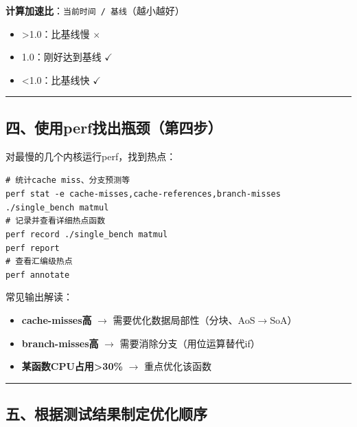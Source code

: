 \documentclass[11pt, a4paper]{article}
\begin{document}
\begin{aibox}
\textbf{计算加速比}：\texttt{当前时间 / 基线}（越小越好）
\begin{itemize}
    \item \textgreater 1.0：比基线慢 $\times$
    \item 1.0：刚好达到基线 $\checkmark$
    \item \textless 1.0：比基线快 $\checkmark$
\end{itemize}

\begin{center}\rule{\textwidth}{0.4pt}\end{center}

\subsection*{四、使用perf找出瓶颈（第四步）}

对最慢的几个内核运行perf，找到热点：

\begin{tcolorbox}[colback=white,colframe=gray!50!white,boxrule=0.5pt,arc=2pt,left=5pt,right=5pt,top=5pt,bottom=5pt]
\texttt{\# 统计cache miss、分支预测等}\\
\texttt{perf stat -e cache-misses,cache-references,branch-misses ./single\_bench matmul}\\[0.5em]
\texttt{\# 记录并查看详细热点函数}\\
\texttt{perf record ./single\_bench matmul}\\
\texttt{perf report}\\[0.5em]
\texttt{\# 查看汇编级热点}\\
\texttt{perf annotate}
\end{tcolorbox}

常见输出解读：
\begin{itemize}
    \item \textbf{cache-misses高} $\rightarrow$ 需要优化数据局部性（分块、AoS$\rightarrow$SoA）
    \item \textbf{branch-misses高} $\rightarrow$ 需要消除分支（用位运算替代if）
    \item \textbf{某函数CPU占用\textgreater 30\%} $\rightarrow$ 重点优化该函数
\end{itemize}

\begin{center}\rule{\textwidth}{0.4pt}\end{center}

\subsection*{五、根据测试结果制定优化顺序}


\end{aibox}
\end{document}
